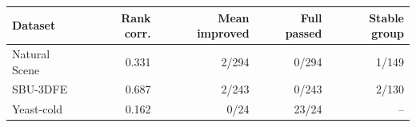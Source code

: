 \begin{center}
\begin{tabular}{lrrrr}
\hline
Dataset & Rank corr. & Mean improved & Full passed & Stable group\\
\hline
Natural Scene & 0.331 & 2/294 & 0/294 & 1/149\\
SBU-3DFE & 0.687 & 2/243 & 0/243 & 2/130\\
Yeast-cold & 0.162 & 0/24 & 23/24 & --\\
\hline
\end{tabular}
\end{center}